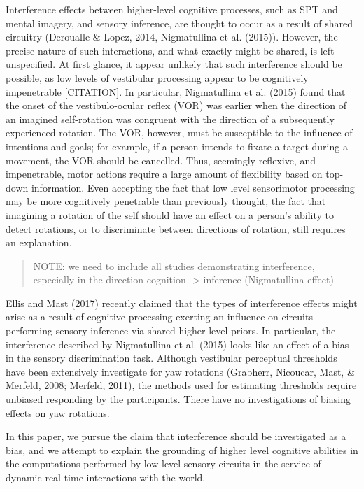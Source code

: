 \documentclass[english,floatsintext,man]{apa6}
\theoremstyle{definition}
\theoremstyle{definition}
\theoremstyle{remark}
\begin{document}
Interference effects between higher-level cognitive processes, such as
SPT and mental imagery, and sensory inference, are thought to occur as a
result of shared circuitry (Deroualle \& Lopez, 2014, Nigmatullina et
al. (2015)). However, the precise nature of such interactions, and what
exactly might be shared, is left unspecified. At first glance, it appear
unlikely that such interference should be possible, as low levels of
vestibular processing appear to be cognitively impenetrable
{[}CITATION{]}. In particular, Nigmatullina et al. (2015) found that the
onset of the vestibulo-ocular reflex (VOR) was earlier when the
direction of an imagined self-rotation was congruent with the direction
of a subsequently experienced rotation. The VOR, however, must be
susceptible to the influence of intentions and goals; for example, if a
person intends to fixate a target during a movement, the VOR should be
cancelled. Thus, seemingly reflexive, and impenetrable, motor actions
require a large amount of flexibility based on top-down information.
Even accepting the fact that low level sensorimotor processing may be
more cognitively penetrable than previously thought, the fact that
imagining a rotation of the self should have an effect on a person's
ability to detect rotations, or to discriminate between directions of
rotation, still requires an explanation.

\begin{quote}
NOTE: we need to include all studies demonstrating interference,
especially in the direction cognition -\textgreater{} inference
(Nigmatullina effect)
\end{quote}

Ellis and Mast (2017) recently claimed that the types of interference
effects might arise as a result of cognitive processing exerting an
influence on circuits performing sensory inference via shared
higher-level priors. In particular, the interference described by
Nigmatullina et al. (2015) looks like an effect of a bias in the sensory
discrimination task. Although vestibular perceptual thresholds have been
extensively investigate for yaw rotations (Grabherr, Nicoucar, Mast, \&
Merfeld, 2008; Merfeld, 2011), the methods used for estimating
thresholds require unbiased responding by the participants. There have
no investigations of biasing effects on yaw rotations.

In this paper, we pursue the claim that interference should be
investigated as a bias, and we attempt to explain the grounding of
higher level cognitive abilities in the computations performed by
low-level sensory circuits in the service of dynamic real-time
interactions with the world.
\end{document}
